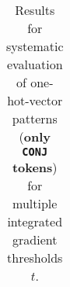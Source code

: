 \begin{table}[t]
\begin{tabular}{lllllll}

\\ \hline
\end{tabular}
\caption[Model Evaluation for only \texttt{CONJ} tokens]{Results for systematic evaluation of one-hot-vector patterns (\textbf{only \texttt{CONJ} tokens}) for multiple integrated gradient thresholds $t$.}
\label{tab:evalResultsCONJ}
\end{table}
	